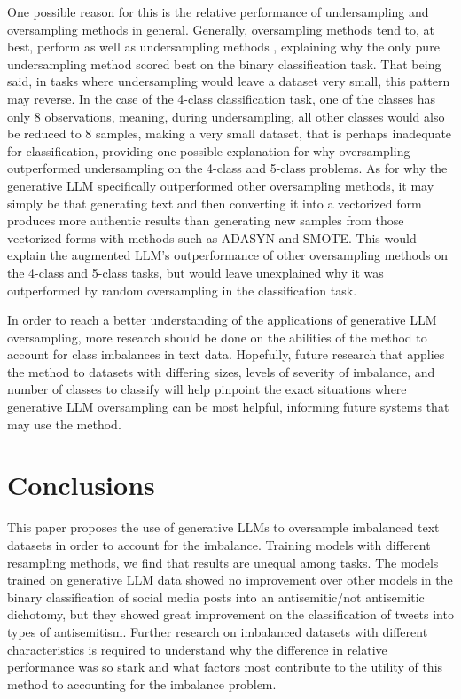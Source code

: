 \documentclass[runningheads]{llncs}
\begin{document}
One possible reason for this is the relative performance of undersampling and oversampling methods in general. Generally, oversampling methods tend to, at best, perform as well as undersampling methods \cite{drummond}, explaining why the only pure undersampling method scored best on the binary classification task. That being said, in tasks where undersampling would leave a dataset very small, this pattern may reverse. In the case of the 4-class classification task, one of the classes has only 8 observations, meaning, during undersampling, all other classes would also be reduced to 8 samples, making a very small dataset, that is perhaps inadequate for classification, providing one possible explanation for why oversampling outperformed undersampling on the 4-class and 5-class problems. As for why the generative LLM specifically outperformed other oversampling methods, it may simply be that generating text and then converting it into a vectorized form produces more authentic results than generating new samples from those vectorized forms with methods such as ADASYN and SMOTE. This would explain the augmented LLM's outperformance of other oversampling methods on the 4-class and 5-class tasks, but would leave unexplained why it was outperformed by random oversampling in the classification task.

In order to reach a better understanding of the applications of generative LLM oversampling, more research should be done on the abilities of the method to account for class imbalances in text data. Hopefully, future research that applies the method to datasets with differing sizes, levels of severity of imbalance, and number of classes to classify will help pinpoint the exact situations where generative LLM oversampling can be most helpful, informing future systems that may use the method.

\section{Conclusions}
This paper proposes the use of generative LLMs to oversample imbalanced text datasets in order to account for the imbalance. Training models with different resampling methods, we find that results are unequal among tasks. The models trained on generative LLM data showed no improvement over other models in the binary classification of social media posts into an antisemitic/not antisemitic dichotomy, but they showed great improvement on the classification of tweets into types of antisemitism. Further research on imbalanced datasets with different characteristics is required to understand why the difference in relative performance was so stark and what factors most contribute to the utility of this method to accounting for the imbalance problem.
\end{document}
